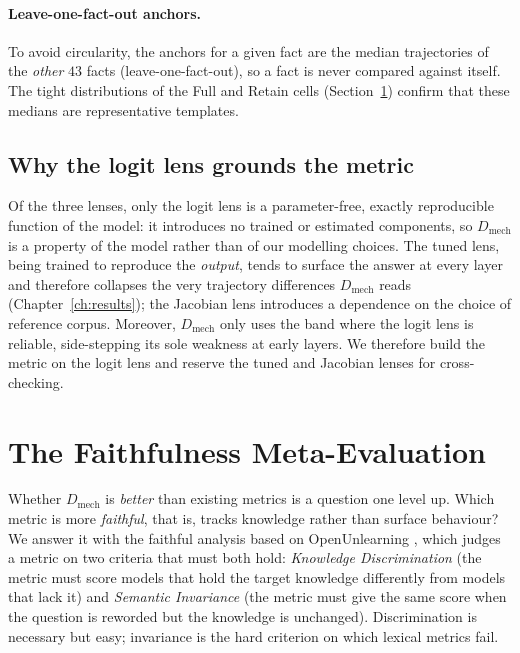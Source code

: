 \paragraph{Leave-one-fact-out anchors.}
To avoid circularity, the anchors for a given fact are the median trajectories of the \emph{other} $43$
facts (leave-one-fact-out), so a fact is never compared against itself. The tight distributions of the Full
and Retain cells (Section~\ref{sec:m-metaeval}) confirm that these medians are representative templates.

\subsection{Why the logit lens grounds the metric}
\label{sec:m-whylogit}

Of the three lenses, only the logit lens is a parameter-free, exactly reproducible function of the model:
it introduces no trained or estimated components, so $D_\text{mech}$ is a property of the model rather than
of our modelling choices. The tuned lens, being trained to reproduce the \emph{output}, tends to surface
the answer at every layer and therefore collapses the very trajectory differences $D_\text{mech}$ reads
(Chapter~\ref{ch:results}); the Jacobian lens introduces a dependence on the choice of reference corpus.
Moreover, $D_\text{mech}$ only uses the band where the logit lens is reliable, side-stepping its sole
weakness at early layers. We therefore build the metric on the logit lens and reserve the tuned and
Jacobian lenses for cross-checking.

\section{The Faithfulness Meta-Evaluation}
\label{sec:m-metaeval}

Whether $D_\text{mech}$ is \emph{better} than existing metrics is a question one level up. Which metric is
more \emph{faithful}, that is, tracks knowledge rather than surface behaviour? We answer it with the
faithful analysis based on OpenUnlearning \citep{dorna2025openunlearning}, which judges a metric on two
criteria that must both hold: \emph{Knowledge Discrimination} (the metric must score models that hold the
target knowledge differently from models that lack it) and \emph{Semantic Invariance} (the metric must give
the same score when the question is reworded but the knowledge is unchanged). Discrimination is necessary
but easy; invariance is the hard criterion on which lexical metrics fail.

